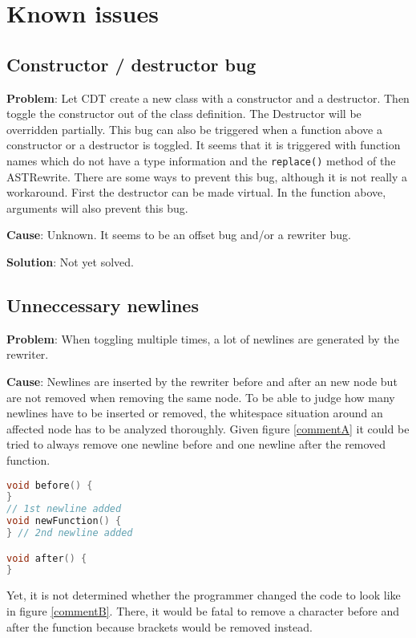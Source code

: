 \section{Known issues}

\subsection{Constructor / destructor bug}
\textbf{Problem}: Let CDT create a new class with a constructor and a destructor. 
Then toggle the constructor out of the class definition. The Destructor will be 
overridden partially. This bug can also be triggered when a function above a
constructor or a destructor is toggled. It seems that it is triggered with
function names which do not have a type information and the \texttt{replace()}
method of the ASTRewrite.
There are some ways to prevent this bug, although it is not really a workaround.
First the destructor can be made virtual. In the function above, arguments will
also prevent this bug.

\textbf{Cause}: Unknown. It seems to be an offset bug and/or a rewriter bug.

\textbf{Solution}: Not yet solved.

\label{newlines}
\subsection{Unneccessary newlines}
\textbf{Problem}: When toggling multiple times, a lot of newlines are generated 
by the rewriter. 

\textbf{Cause}: Newlines are inserted by the rewriter before and after an new
node but are not removed when removing the same node. To be able to judge how 
many newlines have to be inserted or removed, the whitespace situation around an 
affected node has to be analyzed thoroughly. Given figure \ref{commentA} it 
could be tried to always remove one newline before and one newline after the 
removed function.

\begin{lstlisting}[caption={Whitespaces will not be removed blindly},
label={commentA}, language=C++]
void before() {
}
// 1st newline added
void newFunction() {
} // 2nd newline added

void after() {
}
\end{lstlisting}

Yet, it is not determined whether the programmer changed the code to look like 
in figure \ref{commentB}. There, it would be fatal to remove a character before 
and after the function because brackets would be removed instead.

